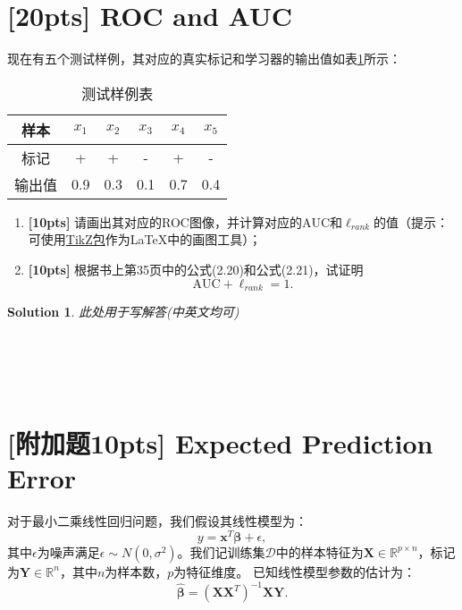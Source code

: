 \documentclass[a4paper,UTF8]{article}
\numberwithin{equation}{section}
\newtheorem*{mySol}{Solution}
\begin{document}
\section{[20pts] ROC and AUC}
现在有五个测试样例，其对应的真实标记和学习器的输出值如表\ref{table:roc}所示：
\begin{table}[!h]
	\centering
	\caption{测试样例表} \vspace{2mm}\label{table:roc}
	\begin{tabular}{c|c c c c c}\hline
		样本 & $x_1$ & $x_2$ & $x_3$  & $x_4$  & $x_5$ \\
		\hline
		标记 & +  & + &  - &  +  & -\\
		\hline
		输出值 & 0.9  & 0.3 &  0.1 &  0.7  & 0.4\\
		\hline
	\end{tabular}
\end{table}
\begin{enumerate}[ {(}1{)}]
\item \textbf{[10pts]} 请画出其对应的ROC图像，并计算对应的$\mbox{AUC}$和$\ell_{rank}$的值（提示：可使用\href{https://en.wikibooks.org/wiki/LaTeX/PGF/TikZ}{TikZ包}作为\LaTeX 中的画图工具）；
\item \textbf{[10pts]} 根据书上第35页中的公式(2.20)和公式(2.21)，试证明\[\mbox{AUC}+\ell_{rank}=1.\]
\end{enumerate}
\begin{mySol}
此处用于写解答(中英文均可)
~\\
~\\
~\\
~\\
~\\
\end{mySol}

\newpage
\section{[附加题10pts] Expected Prediction Error}
对于最小二乘线性回归问题，我们假设其线性模型为：
\begin{equation}
	y=\textbf{x}^T  \bm{ \beta } + \epsilon , 
\end{equation}
其中$\epsilon$为噪声满足$\epsilon\sim N(0,\sigma^2)$。我们记训练集$\mathcal{D}$中的样本特征为$\textbf{X}\in \mathbb{R}^{p \times n}$，标记为$\textbf{Y}\in \mathbb{R}^{n}$，其中$n$为样本数，$p$为特征维度。
已知线性模型参数的估计为：
\begin{equation}
	\hat{\bm{\beta}}=(\textbf{X}\textbf{X}^T)^{-1}\textbf{X}\textbf{Y}.	
\end{equation}
\end{document}
